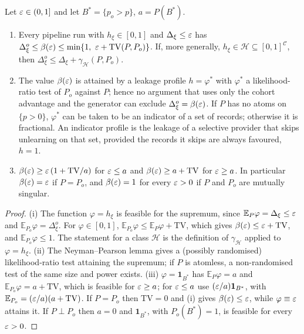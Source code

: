 \begin{theorem}\label{thm:sharp}
Let $\varepsilon\in(0,1]$ and let $B^\ast=\{p_o>p\}$, $a=P(B^\ast)$.
\begin{enumerate}
\item[(i)] Every pipeline run with $h_\xi\in[0,1]$ and $\Delta_\xi\le\varepsilon$ has
$\Delta^o_\xi\le\beta(\eps)\le\min\{1,\ \eps+\mathrm{TV}(P,P_o)\}$. If, more generally,
$h_\xi\in\mathcal H\subseteq[0,1]^{\mathcal C}$, then $\Delta^o_\xi\le\Delta_\xi+
\gamma_{\mathcal H}(P,P_o)$.
\item[(ii)] The value $\beta(\varepsilon)$ is attained by a leakage profile $h=\varphi^\ast$ with
$\varphi^\ast$ a likelihood-ratio test of $P_o$ against $P$; hence no argument that uses
only the cohort advantage and the generator can exclude $\Delta^o_\xi=\beta(\varepsilon)$.
If $P$ has no atoms on $\{p>0\}$, $\varphi^\ast$ can be taken to be an indicator of a set
of records; otherwise it is fractional. An indicator profile is the leakage of a selective
provider that skips unlearning on that set, provided the records it skips are always
favoured, $h=1$.
\item[(iii)] $\beta(\varepsilon)\ge\varepsilon\,(1+\mathrm{TV}/a)$ for $\varepsilon\le a$ and
$\beta(\varepsilon)\ge a+\mathrm{TV}$ for $\varepsilon\ge a$. In particular $\beta(\varepsilon)=\varepsilon$ if
$P=P_o$, and $\beta(\varepsilon)=1$ for every $\varepsilon>0$ if $P$ and $P_o$ are mutually singular.
\end{enumerate}
\end{theorem}

\begin{proof}
(i) The function $\varphi=h_\xi$ is feasible for the supremum, since
$\mathbb{E}_P\varphi=\Delta_\xi\le\varepsilon$ and $\mathbb{E}_{P_o}\varphi=\Delta^o_\xi$. For
$\varphi\in[0,1]$, $\mathbb{E}_{P_o}\varphi\le\mathbb{E}_{P}\varphi+\mathrm{TV}$, which gives
$\beta(\varepsilon)\le\varepsilon+\mathrm{TV}$, and $\mathbb{E}_{P_o}\varphi\le1$. The statement for a
class $\mathcal H$ is the definition of $\gamma_{\mathcal H}$ applied to $\varphi=h_\xi$.
(ii) The Neyman--Pearson lemma \citep{neyman1933efficient} gives a (possibly randomised) likelihood-ratio test attaining
the supremum; if $P$ is atomless, a non-randomised test of the same size and power exists.
(iii) $\varphi=\mathbf 1_{B^\ast}$ has $\mathbb{E}_P\varphi=a$ and
$\mathbb{E}_{P_o}\varphi=a+\mathrm{TV}$, which is feasible for $\varepsilon\ge a$; for $\varepsilon\le a$
use $(\varepsilon/a)\mathbf 1_{B^\ast}$, with $\mathbb{E}_{P_o}=(\varepsilon/a)(a+\mathrm{TV})$. If
$P=P_o$ then $\mathrm{TV}=0$ and (i) gives $\beta(\varepsilon)\le\varepsilon$, while $\varphi\equiv\varepsilon$
attains it. If $P\perp P_o$ then $a=0$ and $\mathbf 1_{B^\ast}$, with $P_o(B^\ast)=1$, is
feasible for every $\varepsilon>0$.
\end{proof}

